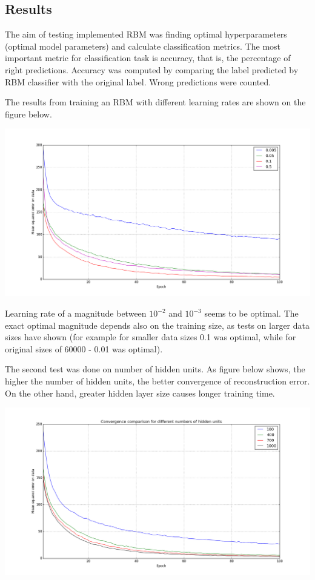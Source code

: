 \documentclass[a4paper]{scrartcl}
\begin{document}
\subsection{Results}
The aim of testing implemented RBM was finding optimal hyperparameters (optimal model parameters) and calculate classification metrics. The most important metric for classification task is accuracy, that is, the percentage of right predictions. Accuracy was computed by comparing the label predicted by RBM classifier with the original label. Wrong predictions were counted.
\par The results from training an RBM with different learning rates are shown on the figure below.
\begin{center}
\includegraphics[width=16cm]{images/lr.png}
\end{center}
Learning rate of a magnitude between $10^{-2}$ and $10^{-3}$ seems to be optimal. The exact optimal magnitude depends also on the training size, as tests on larger data sizes have shown (for example for smaller data sizes 0.1 was optimal, while for original sizes of 60000 - 0.01 was optimal).
\par The second test was done on number of hidden units. As figure below shows, the higher the number of hidden units, the better convergence of reconstruction error. On the other hand, greater hidden layer size causes longer training time.
\begin{center}
\includegraphics[width=16cm]{images/hu.png}
\end{center}
\end{document}
